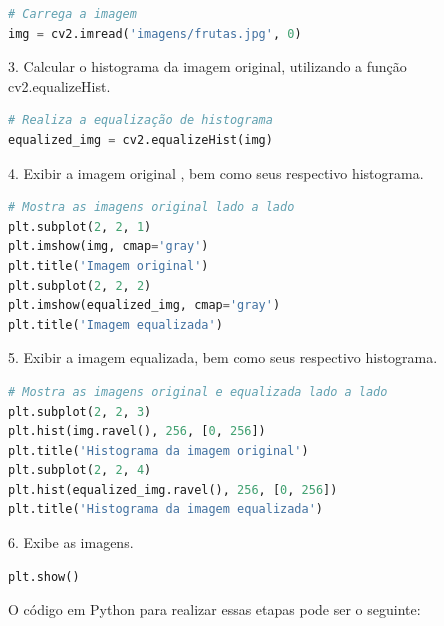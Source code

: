 \documentclass[10pt,a4paper]{article}
\begin{document}
\begin{lstlisting}[language=Python]       
# Carrega a imagem
img = cv2.imread('imagens/frutas.jpg', 0)
\end{lstlisting}

\begin{flushleft}
3. Calcular o histograma da imagem original, utilizando a função cv2.equalizeHist.
\end{flushleft}

\begin{lstlisting}[language=Python]    
# Realiza a equalização de histograma
equalized_img = cv2.equalizeHist(img)
\end{lstlisting}

\begin{flushleft}
4. Exibir a imagem original , bem como seus respectivo histograma.
\end{flushleft}

\begin{lstlisting}[language=Python]        
# Mostra as imagens original lado a lado
plt.subplot(2, 2, 1)
plt.imshow(img, cmap='gray')
plt.title('Imagem original')
plt.subplot(2, 2, 2)
plt.imshow(equalized_img, cmap='gray')
plt.title('Imagem equalizada')
\end{lstlisting}

\begin{flushleft}
5. Exibir a  imagem equalizada, bem como seus respectivo histograma.
\end{flushleft}

\begin{lstlisting}[language=Python]
# Mostra as imagens original e equalizada lado a lado
plt.subplot(2, 2, 3)
plt.hist(img.ravel(), 256, [0, 256])
plt.title('Histograma da imagem original')
plt.subplot(2, 2, 4)
plt.hist(equalized_img.ravel(), 256, [0, 256])
plt.title('Histograma da imagem equalizada')
\end{lstlisting}

\begin{flushleft}
6. Exibe as imagens.
\end{flushleft}

\begin{lstlisting}[language=Python]
plt.show()
\end{lstlisting}

\begin{flushleft}
O código em Python para realizar essas etapas pode ser o seguinte:
\end{flushleft}
\end{document}
